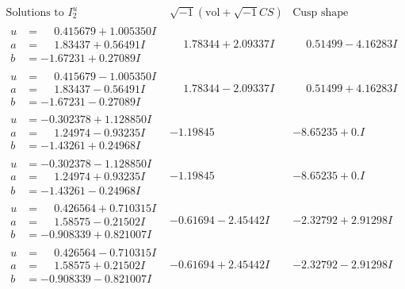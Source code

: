 \documentclass[1p]{elsarticle_modified}
\theoremstyle{definition}
\newcommand{\I}{\sqrt{-1}}
\begin{document}
$$\begin{array}{c|c|c}  
\text{Solutions to }I^u_{2}& \I (\text{vol} + \sqrt{-1}CS) & \text{Cusp shape}\\
 \hline 
\begin{aligned}
u &= \phantom{-}0.415679 + 1.005350 I \\
a &= \phantom{-}1.83437 + 0.56491 I \\
b &= -1.67231 + 0.27089 I\end{aligned}
 & \phantom{-}1.78344 + 2.09337 I & \phantom{-}0.51499 - 4.16283 I \\ \hline\begin{aligned}
u &= \phantom{-}0.415679 - 1.005350 I \\
a &= \phantom{-}1.83437 - 0.56491 I \\
b &= -1.67231 - 0.27089 I\end{aligned}
 & \phantom{-}1.78344 - 2.09337 I & \phantom{-}0.51499 + 4.16283 I \\ \hline\begin{aligned}
u &= -0.302378 + 1.128850 I \\
a &= \phantom{-}1.24974 - 0.93235 I \\
b &= -1.43261 + 0.24968 I\end{aligned}
 & -1.19845\phantom{ +0.000000I} & -8.65235 + 0. I\phantom{ +0.000000I} \\ \hline\begin{aligned}
u &= -0.302378 - 1.128850 I \\
a &= \phantom{-}1.24974 + 0.93235 I \\
b &= -1.43261 - 0.24968 I\end{aligned}
 & -1.19845\phantom{ +0.000000I} & -8.65235 + 0. I\phantom{ +0.000000I} \\ \hline\begin{aligned}
u &= \phantom{-}0.426564 + 0.710315 I \\
a &= \phantom{-}1.58575 - 0.21502 I \\
b &= -0.908339 + 0.821007 I\end{aligned}
 & -0.61694 - 2.45442 I & -2.32792 + 2.91298 I \\ \hline\begin{aligned}
u &= \phantom{-}0.426564 - 0.710315 I \\
a &= \phantom{-}1.58575 + 0.21502 I \\
b &= -0.908339 - 0.821007 I\end{aligned}
 & -0.61694 + 2.45442 I & -2.32792 - 2.91298 I \\ \hline\begin{aligned}

\end{aligned}
\end{array}$$
\end{document}
